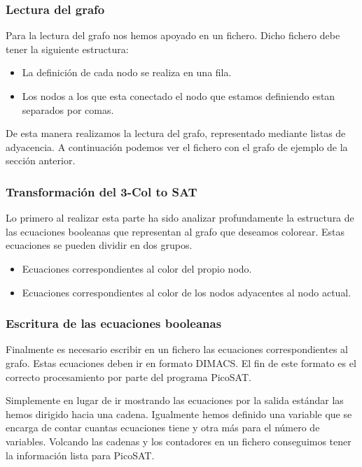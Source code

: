 \documentclass{article}
\begin{document}
    \subsubsection{Lectura del grafo}
        Para la lectura del grafo nos hemos apoyado en un fichero. Dicho fichero debe tener la siguiente estructura:
        \begin{itemize}
            \item La definición de cada nodo se realiza en una fila. 
            \item Los nodos a los que esta conectado el nodo que estamos definiendo estan separados por comas. 
        \end{itemize}

        De esta manera realizamos la lectura del grafo, representado mediante listas de adyacencia.
        A continuación podemos ver el fichero con el grafo de ejemplo de la sección anterior.
    
    \subsubsection{Transformación del 3-Col to SAT}
        Lo primero al realizar esta parte ha sido analizar profundamente la estructura de las ecuaciones booleanas que 
        representan al grafo que deseamos colorear.
        Estas ecuaciones se pueden dividir en dos grupos.
        \begin{itemize}
            \item Ecuaciones correspondientes al color del propio nodo.
            \item Ecuaciones correspondientes al color de los nodos adyacentes al nodo actual.
        \end{itemize}
    
    \subsubsection{Escritura de las ecuaciones booleanas}
        Finalmente es necesario escribir en un fichero las ecuaciones correspondientes al grafo. Estas 
        ecuaciones deben ir en formato DIMACS. El fin de este formato es el correcto procesamiento por parte del 
        programa PicoSAT. 

        Simplemente en lugar de ir mostrando las ecuaciones por la salida estándar las hemos dirigido hacia una cadena. Igualmente 
        hemos definido una variable que se encarga de contar cuantas ecuaciones tiene y otra más para el número de variables. 
        Volcando las cadenas y los contadores en un fichero conseguimos tener la información lista para PicoSAT.
\end{document}

